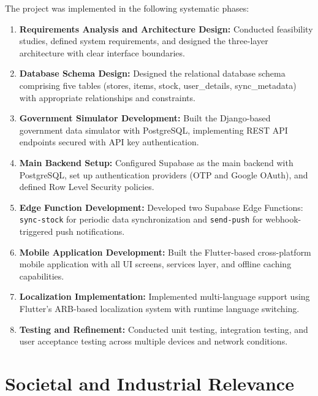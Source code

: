 The project was implemented in the following systematic phases:

\begin{enumerate}[label=\textbf{Step \arabic*:}]
    \item \textbf{Requirements Analysis and Architecture Design:} Conducted feasibility studies, defined system requirements, and designed the three-layer architecture with clear interface boundaries.

    \item \textbf{Database Schema Design:} Designed the relational database schema comprising five tables (stores, items, stock, user\_details, sync\_metadata) with appropriate relationships and constraints.

    \item \textbf{Government Simulator Development:} Built the Django-based government data simulator with PostgreSQL, implementing REST API endpoints secured with API key authentication.

    \item \textbf{Main Backend Setup:} Configured Supabase as the main backend with PostgreSQL, set up authentication providers (OTP and Google OAuth), and defined Row Level Security policies.

    \item \textbf{Edge Function Development:} Developed two Supabase Edge Functions: \newline \texttt{sync-stock} for periodic data synchronization and \texttt{send-push} for webhook-triggered push notifications.

    \item \textbf{Mobile Application Development:} Built the Flutter-based cross-platform mobile application with all UI screens, services layer, and offline caching capabilities.

    \item \textbf{Localization Implementation:} Implemented multi-language support using Flutter's ARB-based localization system with runtime language switching.

    \item \textbf{Testing and Refinement:} Conducted unit testing, integration testing, and user acceptance testing across multiple devices and network conditions.
\end{enumerate}

\section{Societal and Industrial Relevance}

